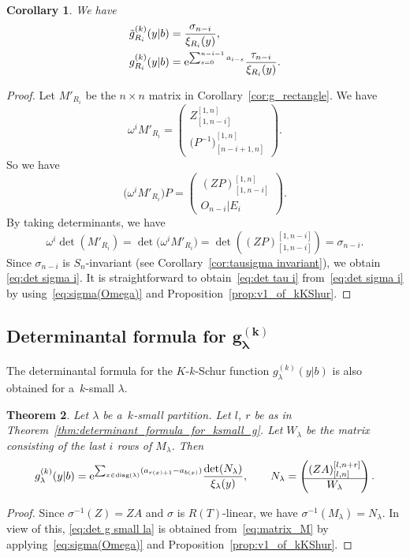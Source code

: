 \documentclass[10pt,a4paper]{amsart}
\numberwithin{equation}{section}
\newcommand{\co}{\xi}
\newcommand{\la}{\lambda}
\newcommand{\Rep}{{R(T)}}
\newtheorem{Theorem}{Theorem}[section]
\newtheorem{Corollary}[Theorem]{Corollary}
\theoremstyle{definition}
\begin{document}
\begin{Corollary}\label{cor:k rect and tau}
We have
 \begin{align}
 \tilde{g}^{(k)}_{R_i}(y|b)&=
 \frac{\sigma_{n-i}}{\co_{R_i}(y)},\label{eq:det sigma i}
 \\ g^{(k)}_{R_i}(y|b)&=
{\rm e}^{\sum_{s=0}^{n-i-1}a_{i-s}}
 \frac{
 \tau_{n-i}}{\co_{R_i}(y)}.\label{eq:det tau i}\end{align}
\end{Corollary}
\begin{proof}
Let $M'_{R_i}$ be the $n\times n$ matrix in Corollary~\ref{cor:g_rectangle}. We have
\[
\omega^{i}M'_{R_i}=
\left(
\begin{matrix}
Z_{[1,n-i]}^{[1,n]}\\\hline
{
\bigl(P^{-1}\bigr)}^{[1,n]}_{[n-i+1,n]}
\end{matrix}
\right).
\]
So we have
\[
\bigl(\omega^{i}M'_{R_i}\bigr)P=
\left(
\begin{matrix}
(ZP)_{[1,n-i]}^{[1,n]}\\
\hline
O_{n-i}|E_{i}
\end{matrix}
\right).
\]
By taking determinants, we have
\[
\omega^{i}\det(M'_{R_i})
=\det\bigl(\omega^{i}M'_{R_i}\bigr)=\det\left((ZP)^{[1,n-i]}_{[1,n-i]}\right)=\sigma_{n-i}.
\]
Since $\sigma_{n-i}$ is $S_n$-invariant (see Corollary~\ref{cor:tausigma invariant}), we obtain
\eqref{eq:det sigma i}.
%
It is straightforward to obtain~\eqref{eq:det tau i} from~\eqref{eq:det sigma i}
by using~\eqref{eq:sigma(Omega)} and
Proposition~\ref{prop:v1_of_kKShur}.
\end{proof}




\subsection[Determinantal formula for g\^{}(k)\_lambda]{Determinantal formula for $\boldsymbol{g^{(k)}_\lambda}$}

The determinantal formula for the $K$-$k$-Schur function $g^{(k)}_\lambda(y|b)$ is also obtained for a~$k$-small $\lambda$.
\begin{Theorem}\label{thm:determinantal_formula_for_g}
Let $\lambda$ be a~$k$-small partition.
Let $l$, $r$ be as in Theorem~{\rm\ref{thm:determinant_formula_for_ksmall_g}}.
Let $W_\la$ be the matrix consisting of the last $i$ rows of $M_{\la}$.
Then \begin{equation}
g^{(k)}_{\lambda}(y|b)
={\rm e}^{\sum_{x\in \mathrm{diag}(\lambda)}(a_{r(x)+1}-a_{b(x)})}
\frac{\det(N_\lambda)}{\co_\la(y)},\qquad
N_\lambda=
\left(
\begin{matrix}
 (ZA)_{[l,n]}^{[l,n+r]} \\ \hline
 W_{\la}
\end{matrix}
\right).
\label{eq:det g small la}
\end{equation}
\end{Theorem}
\begin{proof} Since $\sigma^{-1}(Z)=ZA$ and $\sigma$ is $\Rep$-linear, we have
$\sigma^{-1}(M_\la)=N_\la.
$ In view of this,
\eqref{eq:det g small la}
is obtained from~\eqref{eq:matrix_M} by applying~\eqref{eq:sigma(Omega)} and Proposition~\ref{prop:v1_of_kKShur}.
\end{proof}
\end{document}
